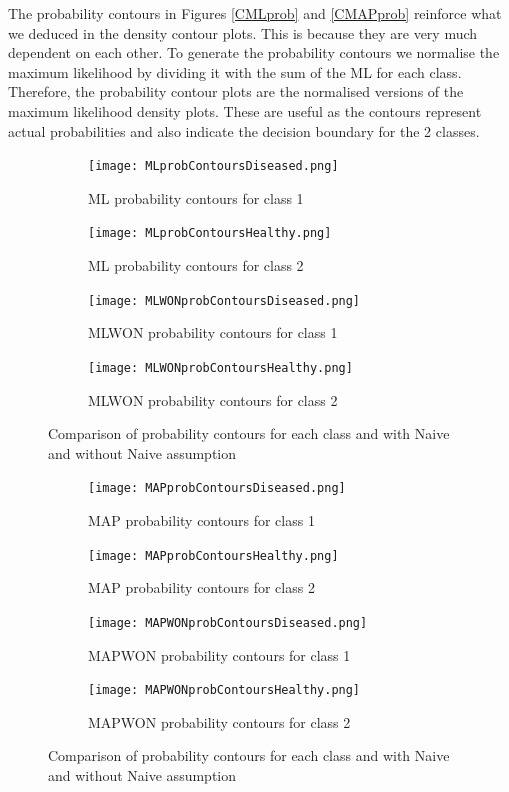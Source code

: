 {{The probability contours in Figures \ref{CMLprob} and \ref{CMAPprob} reinforce what we deduced in the density contour plots. This is because they are very much dependent on each other. To generate the probability contours we normalise the maximum likelihood by dividing it with the sum of the ML for each class. Therefore, the probability contour plots are the normalised versions of the maximum likelihood density plots. These are useful as the contours represent actual probabilities and also indicate the decision boundary for the 2 classes.

\begin{figure}[h!] 
	\centering
	\begin{subfigure}[b]{.40\textwidth}
		\texttt{[image: MLprobContoursDiseased.png]}
		\caption{ML probability contours for class 1}
		\label{fig:model0}
	\end{subfigure}
	\begin{subfigure}[b]{0.40\textwidth}
		\texttt{[image: MLprobContoursHealthy.png]}
		\caption{ML probability contours for class 2}
		\label{fig:model1}
	\end{subfigure}
	\begin{subfigure}[b]{.40\textwidth}
		\texttt{[image: MLWONprobContoursDiseased.png]}
		\caption{MLWON probability contours for class 1}
		\label{fig:model2}
	\end{subfigure}
	\begin{subfigure}[b]{.40\textwidth}
		\texttt{[image: MLWONprobContoursHealthy.png]}
		\caption{MLWON probability contours for class 2}
		\label{fig:model3}
	\end{subfigure}
	\caption{Comparison of probability contours for each class and with Naive and without Naive assumption}
	\label{fig:CMLprob}
\end{figure}

\begin{figure}[h!] 
	\centering
	\begin{subfigure}[b]{.49\textwidth}
		\texttt{[image: MAPprobContoursDiseased.png]}
		\caption{MAP probability contours for class 1}
		\label{fig:model0}
	\end{subfigure}
	\begin{subfigure}[b]{.49\textwidth}
		\texttt{[image: MAPprobContoursHealthy.png]}
		\caption{MAP probability contours for class 2}
		\label{fig:model1}
	\end{subfigure}
	\begin{subfigure}[b]{.49\textwidth}
		\texttt{[image: MAPWONprobContoursDiseased.png]}
		\caption{MAPWON probability contours for class 1}
		\label{fig:model2}
	\end{subfigure}
	\begin{subfigure}[b]{.49\textwidth}
		\texttt{[image: MAPWONprobContoursHealthy.png]}
		\caption{MAPWON probability contours for class 2}
		\label{fig:model3}
	\end{subfigure}
	\caption{Comparison of probability contours for each class and with Naive and without Naive assumption}
	\label{fig:CMAPprob}
\end{figure}

}}
